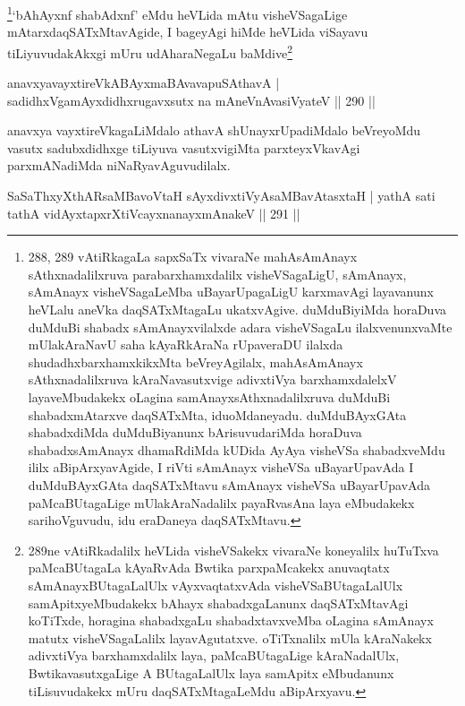 \begin{artha}
\footnote{288, 289 vAtiRkagaLa sapxSaTx vivaraNe \mdash mahAsAmAnayx sAthxnadalilxruva parabarxhamxdalilx visheVSagaLigU, sAmAnayx, sAmAnayx visheVSagaLeMba uBayarUpagaLigU karxmavAgi layavanunx heVLalu aneVka daqSATxMtagaLu ukatxvAgive. duMduBiyiMda horaDuva duMduBi shabadx sAmAnayxvilalxde adara visheVSagaLu ilalxvenunxvaMte mUlakAraNavU saha kAyaRkAraNa rUpaveraDU ilalxda shudadhxbarxhamxkikxMta beVreyAgilalx, mahAsAmAnayx sAthxnadalilxruva kAraNavasutxvige adivxtiVya barxhamxdalelxV layaveMbudakekx oLagina samAnayxsAthxnadalilxruva duMduBi shabadxmAtarxve daqSATxMta, idu\break oMdaneyadu. duMduBAyxGAta shabadxdiMda duMduBiyanunx bArisuvudariMda horaDuva shabadxsAmAnayx dhamaRdiMda kUDida AyAya visheVSa shabadxveMdu ililx aBipArxyavAgide, I riVti sAmAnayx visheVSa uBayarUpavAda I duMduBAyxGAta daqSATxMtavu sAmAnayx visheVSa uBayarUpavAda paMcaBUtagaLige mUlakAraNadalilx payaRvasAna laya eMbudakekx sarihoVguvudu, idu eraDaneya daqSATxMtavu.}`bAhAyxnf shabAdxnf' eMdu heVLida mAtu visheVSagaLige mAtarx\break daqSATxMtavAgide, I bageyAgi hiMde heVLida viSayavu tiLiyuvudakAkxgi mUru udAharaNegaLu baMdive\footnote{289ne vAtiRkadalilx heVLida visheVSakekx vivaraNe \mdash koneyalilx huTuTxva paMcaBUtagaLa kAyaRvAda Bwtika parxpaMcakekx anuvaqtatx sAmAnayxBUtagaLalUlx vAyxvaqtatxvAda visheVSaBUtagaLalUlx samApitxyeMbudakekx bAhayx shabadxgaLanunx daqSATxMtavAgi koTiTxde, horagina shabadxgaLu shabadxtavxveMba oLagina sAmAnayx matutx visheVSagaLalilx layavAgutatxve. oTiTxnalilx mUla kAraNakekx adivxtiVya barxhamxdalilx laya, paMcaBUtagaLige kAraNadalUlx, BwtikavasutxgaLige A BUtagaLalUlx laya samApitx eMbudanunx tiLisuvudakekx mUru daqSATxMtagaLeMdu aBipArxyavu.}
\end{artha}

\begin{shl}
anavxyavayxtireVkABAyxmaBAvavapuSA\s thavA |
sadidhxVgamAyxdidhxrugavxsutx na mAneVnAvasiVyateV \hfill || 290 ||
\end{shl}

\begin{artha}
anavxya vayxtireVkagaLiMdalo athavA shUnayxrUpadiMdalo beVreyoMdu vasutx sadubxdidhxge tiLiyuva vasutxvigiMta parxteyxVkavAgi parxmANadiMda niNaRyavAguvudilalx.
\end{artha}

\begin{shl}
SaSaThxyXthARsaMBavoV\s taH sAyxdivxtiVyAsaMBavAtasxtaH |
yathA sati tathA vidAyxtapxrXtiVcayxnanayxmAnakeV \hfill || 291 ||
\end{shl}

